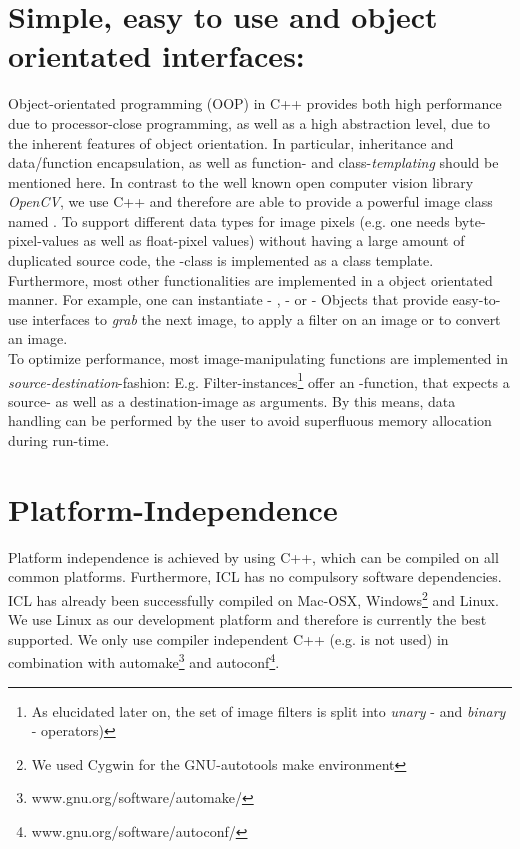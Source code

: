 \section{Simple, easy to use and object orientated interfaces:}
Object-orientated programming (OOP) in C++ provides both high performance due to processor-close programming, as well as a high abstraction level, due to the inherent features of object orientation. In particular, inheritance and data/function encapsulation, as well as function- and class-\emph{templating} should be mentioned here. In contrast to the well known open computer vision library \emph{OpenCV}, we use C++ and therefore are able to provide a powerful image class named  . To support different data types for image pixels (e.g. one needs byte-pixel-values as well as float-pixel values) without having a large amount of duplicated source code, the -class is implemented as a class template.\\
Furthermore, most other functionalities are implemented in a object orientated manner. For example, one can instantiate  - ,  - or  - Objects that provide easy-to-use interfaces to \emph{grab} the next image, to apply a filter on an image or to convert an image.\\
To optimize performance, most image-manipulating functions are implemented in \emph{source-destination}-fashion: E.g. Filter-instances\footnote{As elucidated later on, the set of image filters is split into \emph{unary} - and \emph{binary} - operators)} offer an -function, that expects a source- as well as a destination-image as arguments. By this means, data handling can be performed by the user to avoid superfluous memory allocation during run-time. 


\section{Platform-Independence}
Platform independence is achieved by using C++, which can be compiled on all common platforms. Furthermore, ICL has no compulsory software dependencies. ICL has already been successfully compiled on Mac-OSX, Windows\footnote{We used Cygwin for the GNU-autotools make environment} and Linux. We use Linux as our development platform and therefore is currently the best supported. We only use compiler independent C++ (e.g.  is not used) in combination with automake\footnote{www.gnu.org/software/automake/} and autoconf\footnote{www.gnu.org/software/autoconf/}.  

